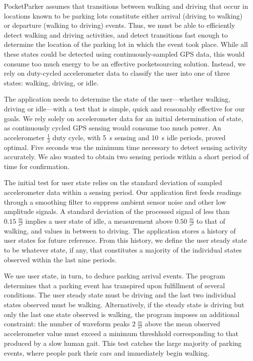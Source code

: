 PocketParker assumes that transitions between walking and driving that occur
in locations known to be parking lots constitute either arrival (driving to
walking) or departure (walking to driving) events. Thus, we must be able to
efficiently detect walking and driving activities, and detect transitions
fast enough to determine the location of the parking lot in which the event
took place. While all these states could be detected using
continuously-sampled GPS data, this would consume too much energy to be an
effective pocketsourcing solution. Instead, we rely on duty-cycled
accelerometer data to classify the user into one of three states: walking,
driving, or idle.

The application needs to determine the state of the user---whether walking,
driving or idle---with a test that is simple, quick and reasonably effective
for our goals.  We rely solely on accelerometer data for an initial
determination of state, as continuously cycled GPS sensing would consume too
much power. An accelerometer $\frac{1}{3}$ duty cycle, with 5~s sensing and
10~s idle periods, proved optimal. Five seconds was the minimum time
necessary to detect sensing activity accurately. We also wanted to obtain two
sensing periods within a short period of time for confirmation.

The initial test for user state relies on the standard deviation of sampled
accelerometer data within a sensing period. Our application first feeds
readings through a smoothing filter to suppress ambient sensor noise and
other low amplitude signals. A standard deviation of the processed signal of
less than $0.15\;\frac{m}{s^2}$ implies a user state of idle, a measurement
above $0.50\;\frac{m}{s^2}$ to that of walking, and values in between to
driving. The application stores a history of user states for future
reference. From this history, we define the user steady state to be whatever
state, if any, that constitutes a majority of the individual states observed
within the last nine periods.

We use user state, in turn, to deduce parking arrival events. The program
determines that a parking event has transpired upon fulfillment of several
conditions. The user steady state must be driving and the last two
individual states observed must be walking. Alternatively, if the steady
state is driving but only the last one state observed is walking, the program
imposes an additional constraint: the number of waveform peaks
$2\;\frac{m}{s^2}$ above the mean observed accelerometer value must exceed
a minimum threshhold corresponding to that produced by a slow human gait.
This test catches the large majority of parking events, where people park
their cars and immediately begin walking.

